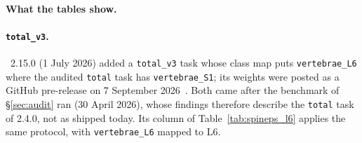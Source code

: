 \paragraph{What the tables show.}
\PENDING{}

\paragraph{\TS{} \texttt{total\_v3}.}
\label{app:tsv3}
\TS{}~2.15.0 (1 July 2026) added a \texttt{total\_v3} task whose class map puts
\texttt{vertebrae\_L6} where the audited \texttt{total} task has \texttt{vertebrae\_S1}; its
weights were posted as a GitHub pre-release on 7 September
2026~\citep{TotalSegmentatorCode}. Both came after the benchmark of \S\ref{sec:audit} ran
(30 April 2026), whose findings therefore describe the \texttt{total} task of 2.4.0, not
\TS{} as shipped today. Its column of Table~\ref{tab:spineps_l6} applies the same
protocol, with \texttt{vertebrae\_L6} mapped to L6. \PENDING{}
